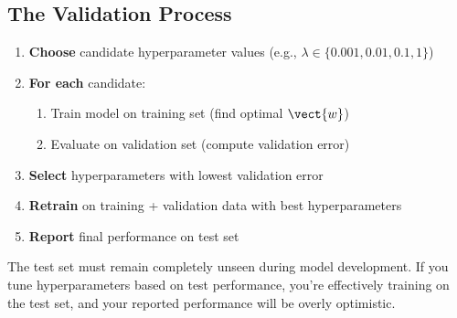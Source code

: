 \begin{center}
\end{center}

\subsection{The Validation Process}

\begin{enumerate}
    \item \textbf{Choose} candidate hyperparameter values (e.g., $\lambda \in \{0.001, 0.01, 0.1, 1\}$)
    \item \textbf{For each} candidate:
    \begin{enumerate}
        \item Train model on training set (find optimal $\vect{w}$)
        \item Evaluate on validation set (compute validation error)
    \end{enumerate}
    \item \textbf{Select} hyperparameters with lowest validation error
    \item \textbf{Retrain} on training + validation data with best hyperparameters
    \item \textbf{Report} final performance on test set
\end{enumerate}

\begin{importantbox}
The test set must remain completely unseen during model development. If you tune hyperparameters based on test performance, you're effectively training on the test set, and your reported performance will be overly optimistic.
\end{importantbox}

